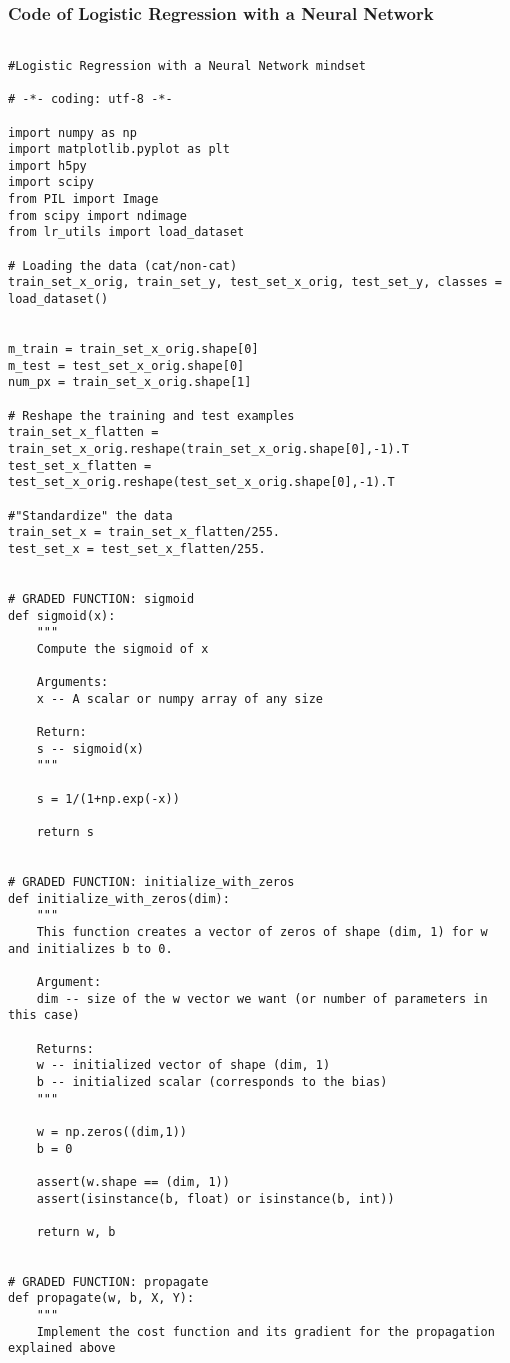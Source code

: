 \subsubsection{Code of Logistic Regression with a Neural Network}
\begin{verbatim}

#Logistic Regression with a Neural Network mindset

# -*- coding: utf-8 -*-

import numpy as np
import matplotlib.pyplot as plt
import h5py
import scipy
from PIL import Image
from scipy import ndimage
from lr_utils import load_dataset

# Loading the data (cat/non-cat)
train_set_x_orig, train_set_y, test_set_x_orig, test_set_y, classes = load_dataset()


m_train = train_set_x_orig.shape[0]
m_test = test_set_x_orig.shape[0]
num_px = train_set_x_orig.shape[1]

# Reshape the training and test examples
train_set_x_flatten = train_set_x_orig.reshape(train_set_x_orig.shape[0],-1).T
test_set_x_flatten = test_set_x_orig.reshape(test_set_x_orig.shape[0],-1).T

#"Standardize" the data
train_set_x = train_set_x_flatten/255.
test_set_x = test_set_x_flatten/255.


# GRADED FUNCTION: sigmoid
def sigmoid(x):
    """
    Compute the sigmoid of x

    Arguments:
    x -- A scalar or numpy array of any size

    Return:
    s -- sigmoid(x)
    """

    s = 1/(1+np.exp(-x))
    
    return s


# GRADED FUNCTION: initialize_with_zeros
def initialize_with_zeros(dim):
    """
    This function creates a vector of zeros of shape (dim, 1) for w and initializes b to 0.
    
    Argument:
    dim -- size of the w vector we want (or number of parameters in this case)
    
    Returns:
    w -- initialized vector of shape (dim, 1)
    b -- initialized scalar (corresponds to the bias)
    """

    w = np.zeros((dim,1))
    b = 0

    assert(w.shape == (dim, 1))
    assert(isinstance(b, float) or isinstance(b, int))
    
    return w, b


# GRADED FUNCTION: propagate
def propagate(w, b, X, Y):
    """
    Implement the cost function and its gradient for the propagation explained above


\end{verbatim}
